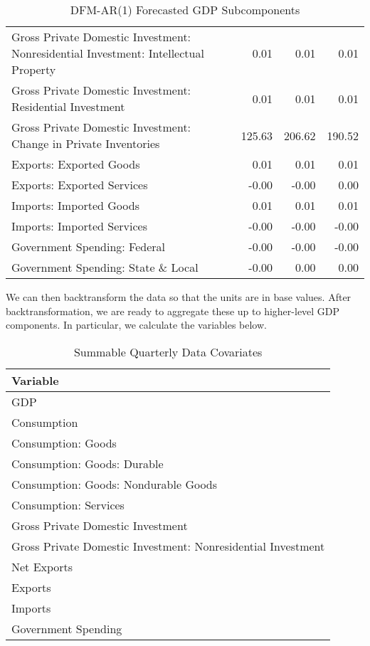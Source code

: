 \documentclass[11pt, letterpaper]{article}\usepackage[]{graphicx}\usepackage[]{color}
\begin{document}
\begin{table}[H]
\begin{tabular}{lrrr}
  Gross Private Domestic Investment: Nonresidential Investment: Intellectual Property & 0.01 & 0.01 & 0.01 \\ 
  Gross Private Domestic Investment: Residential Investment & 0.01 & 0.01 & 0.01 \\ 
  Gross Private Domestic Investment: Change in Private Inventories & 125.63 & 206.62 & 190.52 \\ 
  Exports: Exported Goods & 0.01 & 0.01 & 0.01 \\ 
  Exports: Exported Services & -0.00 & -0.00 & 0.00 \\ 
  Imports: Imported Goods & 0.01 & 0.01 & 0.01 \\ 
  Imports: Imported Services & -0.00 & -0.00 & -0.00 \\ 
  Government Spending: Federal & -0.00 & -0.00 & -0.00 \\ 
  Government Spending: State \& Local & -0.00 & 0.00 & 0.00 \\ 
   \hline
\end{tabular}
\endgroup
\caption{DFM-AR(1) Forecasted GDP Subcomponents} 
\end{table}


We can then backtransform the data so that the units are in base values. After backtransformation, we are ready to aggregate these up to higher-level GDP components. In particular, we calculate the variables below.
\begin{table}[H]
\centering
\begingroup\scriptsize
\begin{tabular}{l}
  \hline
Variable \\ 
  \hline
GDP \\ 
  Consumption \\ 
  Consumption: Goods \\ 
  Consumption: Goods: Durable \\ 
  Consumption: Goods: Nondurable Goods \\ 
  Consumption: Services \\ 
  Gross Private Domestic Investment \\ 
  Gross Private Domestic Investment: Nonresidential Investment \\ 
  Net Exports \\ 
  Exports \\ 
  Imports \\ 
  Government Spending \\ 
   \hline
\end{tabular}
\endgroup
\caption{Summable Quarterly Data Covariates} 
\end{table}
\end{document}
